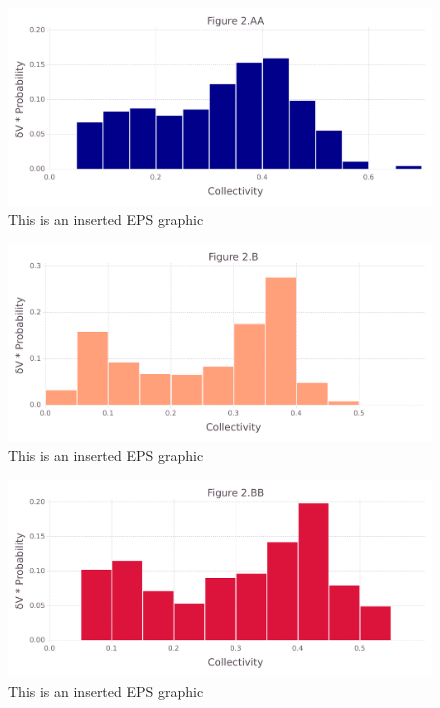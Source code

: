 \documentclass[10pt,letterpaper]{article}
\begin{document}
\begin{figure}[ht]
\begin{center}
\includegraphics[scale=0.5]{1hvr_apo/2aafigure_hi-precision.pdf}
\caption{This is an inserted EPS graphic}
\label{fig4}
\end{center}
\end{figure}

\begin{figure}[ht]
\begin{center}
\includegraphics[scale=0.5]{1hvr_apo/2bfigure_hi-precision.pdf}
\caption{This is an inserted EPS graphic}
\label{fig5}
\end{center}
\end{figure}

\begin{figure}[ht]
\begin{center}
\includegraphics[scale=0.5]{1hvr_apo/2bbfigure_hi-precision.pdf}
\caption{This is an inserted EPS graphic}
\label{fig6}
\end{center}
\end{figure}
\end{document}
